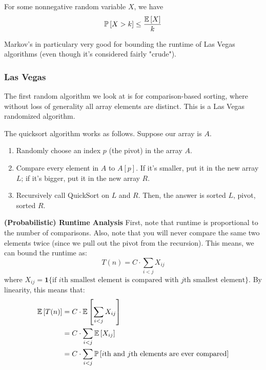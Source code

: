 \begin{theorem}
    For some nonnegative random variable $X$, we have
    \[ \mathbb{P}\left[ X > k \right] \leq \frac{\mathbb{E}\left[ X \right]}{k} \]
\end{theorem}

Markov's in particulary very good for bounding the runtime of Las Vegas algorithms (even though it's considered fairly "crude").

\subsubsection{Las Vegas}
The first random algorithm we look at is for comparison-based sorting, where without loss of generality all array elements are distinct. This is a Las Vegas randomized algorithm.
\begin{algothm}[QuickSort]
    The quicksort algorithm works as follows. Suppose our array is $A$.
    \begin{enumerate}
        \item Randomly choose an index $p$ (the pivot) in the array $A$.
        \item Compare every element in $A$ to $A[p]$. If it's smaller, put it in the new array $L$; if it's bigger, put it in the new array $R$.
        \item Recursively call QuickSort on $L$ and $R$. Then, the answer is sorted $L$, pivot, sorted $R$.
    \end{enumerate}

    \textbf{(Probabilistic) Runtime Analysis}
    First, note that runtime is proportional to the number of comparisons. Also, note that you will never compare the same two elements twice (since we pull out the pivot from the recursion).
    This means, we can bound the runtime as:
    \[ T(n) = C \cdot \sum_{i < j} X_{ij} \]
    where $X_{ij} = \mathbf{1}\{\text{if $i$th smallest element is compared with $j$th smallest element}\}$. By linearity, this means that:
    \begin{align*}
        \mathbb{E}\left[ T(n) \right] &= C \cdot \mathbb{E}\left[ \sum_{i <j} X_{ij} \right] \\
        &= C \cdot \sum_{i < j} \mathbb{E}\left[ X_{ij} \right] \\
        &= C \cdot \sum_{i < j} \mathbb{P}\left[ \text{$i$th and $j$th elements are ever compared} \right]
    \end{align*}


\end{algothm}
